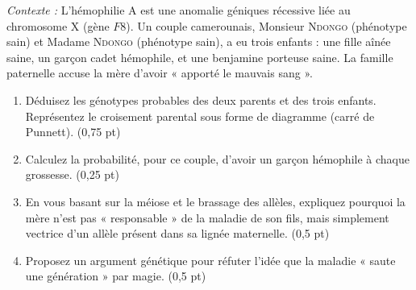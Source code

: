 \documentclass[11pt]{article}
\begin{document}
\begin{exercice}
\emph{Contexte :} L'hémophilie A est une anomalie géniques récessive liée au chromosome X (gène $F8$). Un couple camerounais, Monsieur \textsc{Ndongo} (phénotype sain) et Madame \textsc{Ndongo} (phénotype sain), a eu trois enfants : une fille aînée saine, un garçon cadet hémophile, et une benjamine porteuse saine. La famille paternelle accuse la mère d'avoir « apporté le mauvais sang ».
\begin{enumerate}
\item Déduisez les génotypes probables des deux parents et des trois enfants. Représentez le croisement parental sous forme de diagramme (carré de Punnett). \hfill (0,75 pt)
\item Calculez la probabilité, pour ce couple, d'avoir un garçon hémophile à chaque grossesse. \hfill (0,25 pt)
\item En vous basant sur la méiose et le brassage des allèles, expliquez pourquoi la mère n'est pas « responsable » de la maladie de son fils, mais simplement vectrice d'un allèle présent dans sa lignée maternelle. \hfill (0,5 pt)
\item Proposez un argument génétique pour réfuter l'idée que la maladie « saute une génération » par magie. \hfill (0,5 pt)
\end{enumerate}
\end{exercice}
\end{document}
